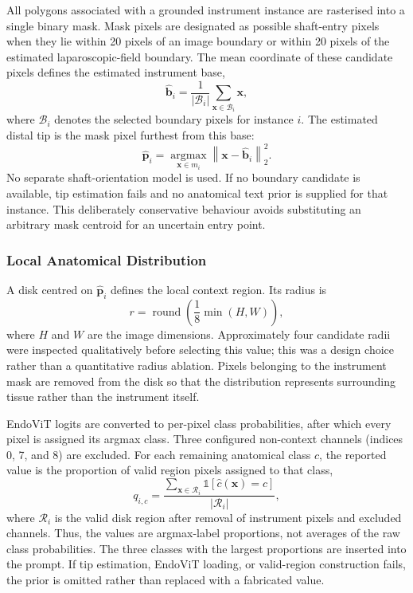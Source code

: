 All polygons associated with a grounded instrument instance are rasterised into a single binary mask. Mask pixels are designated as possible shaft-entry pixels when they lie within 20 pixels of an image boundary or within 20 pixels of the estimated laparoscopic-field boundary. The mean coordinate of these candidate pixels defines the estimated instrument base,
\begin{equation}
    \hat{\mathbf{b}}_i
    = \frac{1}{|\mathcal{B}_i|}
      \sum_{\mathbf{x}\in\mathcal{B}_i}\mathbf{x},
    \label{eq:c5:appendix-tip-base}
\end{equation}
where \(\mathcal{B}_i\) denotes the selected boundary pixels for instance \(i\). The estimated distal tip is the mask pixel furthest from this base:
\begin{equation}
    \hat{\mathbf{p}}_i
    = \underset{\mathbf{x}\in m_i}{\operatorname{argmax}}
      \left\|\mathbf{x}-\hat{\mathbf{b}}_i\right\|_2^2.
    \label{eq:c5:appendix-tip-point}
\end{equation}
No separate shaft-orientation model is used. If no boundary candidate is available, tip estimation fails and no anatomical text prior is supplied for that instance. This deliberately conservative behaviour avoids substituting an arbitrary mask centroid for an uncertain entry point.

\subsubsection{Local Anatomical Distribution}

A disk centred on \(\hat{\mathbf{p}}_i\) defines the local context region. Its radius is
\begin{equation}
    r = \operatorname{round}\!\left(\frac{1}{8}\min(H,W)\right),
    \label{eq:c5:appendix-tip-radius}
\end{equation}
where \(H\) and \(W\) are the image dimensions. Approximately four candidate radii were inspected qualitatively before selecting this value; this was a design choice rather than a quantitative radius ablation. Pixels belonging to the instrument mask are removed from the disk so that the distribution represents surrounding tissue rather than the instrument itself.

EndoViT logits are converted to per-pixel class probabilities, after which every pixel is assigned its argmax class. Three configured non-context channels (indices 0, 7, and 8) are excluded. For each remaining anatomical class \(c\), the reported value is the proportion of valid region pixels assigned to that class,
\begin{equation}
    q_{i,c}
    = \frac{\sum_{\mathbf{x}\in\mathcal{R}_i}
        \mathbb{1}[\hat{c}(\mathbf{x})=c]}
      {|\mathcal{R}_i|},
    \label{eq:c5:appendix-anatomy-proportion}
\end{equation}
where \(\mathcal{R}_i\) is the valid disk region after removal of instrument pixels and excluded channels. Thus, the values are argmax-label proportions, not averages of the raw class probabilities. The three classes with the largest proportions are inserted into the prompt. If tip estimation, EndoViT loading, or valid-region construction fails, the prior is omitted rather than replaced with a fabricated value.


